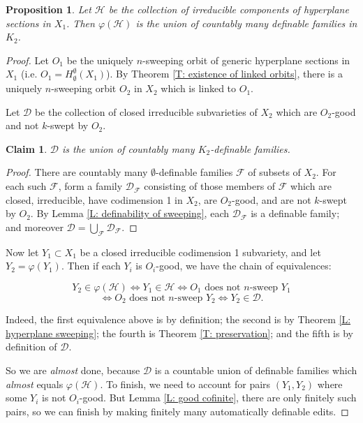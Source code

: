 \documentclass{amsart}
\newtheorem{claim}[theorem]{Claim}
\newtheorem{proposition}[theorem]{Proposition}
\theoremstyle{definition}
\begin{document}
\begin{proposition}
     Let $\mathcal H$ be the collection of irreducible components of hyperplane sections in $X_1$. Then $\varphi(\mathcal H)$ is the union of countably many definable families in $K_2$.
\end{proposition}\label{P: ctbly many families}
\begin{proof}
  Let $O_1$ be the uniquely $n$-sweeping orbit of generic hyperplane sections in $X_1$ (i.e. $O_1=H_\emptyset^{\emptyset}(X_1)$). By Theorem \ref{T: existence of linked orbits}, there is a uniquely $n$-sweeping orbit $O_2$ in $X_2$ which is linked to $O_1$. 
  
  Let $\mathcal D$ be the collection of closed irreducible subvarieties of $X_2$ which are $O_2$-good and not $k$-swept by $O_2$. 
  \begin{claim}
    $\mathcal D$ is the union of countably many $K_2$-definable families.
    \end{claim}
    \begin{proof} There are countably many $\emptyset$-definable families $\mathcal F$ of subsets of $X_2$. For each such $\mathcal F$, form a family $\mathcal D_\mathcal F$ consisting of those members of $\mathcal F$ which are closed, irreducible, have codimension 1 in $X_2$, are $O_2$-good, and are not $k$-swept by $O_2$. By Lemma \ref{L: definability of sweeping}, each $\mathcal D_{\mathcal F}$ is a definable family; and moreover $\mathcal D=\bigcup_{\mathcal F}\mathcal D_{\mathcal F}$.
    \end{proof}
    
    Now let $Y_1\subset X_1$ be a closed irreducible codimension 1 subvariety, and let $Y_2=\varphi(Y_1)$. Then if each $Y_i$ is $O_i$-good, we have the chain of equivalences:

  $$Y_2\in\mathcal\varphi(\mathcal H)\iff Y_1\in\mathcal H\iff O_1\textrm{ does not $n$-sweep }Y_1$$ $$\iff O_2\textrm{ does not $n$-sweep }Y_2\iff Y_2\in\mathcal D.$$

  Indeed, the first equivalence above is by definition; the second is by Theorem \ref{L: hyperplane sweeping}; the fourth is Theorem \ref{T: preservation}; and the fifth is by definition of $\mathcal D$.

  So we are \textit{almost} done, because $\mathcal D$ is a countable union of definable families which \textit{almost} equals $\varphi(\mathcal H)$. To finish, we need to account for pairs $(Y_1,Y_2)$ where some $Y_i$ is not $O_i$-good. But Lemma \ref{L: good cofinite}, there are only finitely such pairs, so we can finish by making finitely many automatically definable edits.
  

\end{proof}
\end{document}
